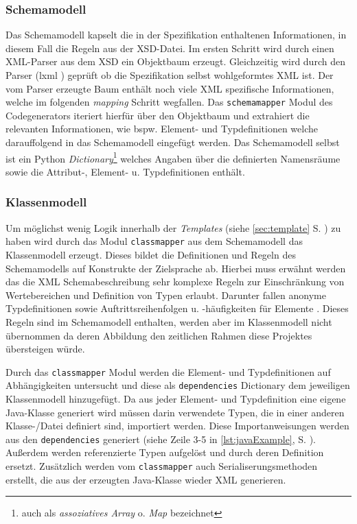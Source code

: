 \subsubsection{Schemamodell}
\label{sec:schemamodel}

Das Schemamodell kapselt die in der Spezifikation enthaltenen Informationen, in diesem Fall die Regeln aus der \gls{XSD}-Datei. Im ersten Schritt wird durch einen XML-Parser aus dem \gls{XSD} ein Objektbaum erzeugt. Gleichzeitig wird durch den Parser (lxml \cite{lxml}) geprüft ob die Spezifikation selbst wohlgeformtes \gls{XML} ist.
Der vom Parser erzeugte Baum enthält noch viele \gls{XML} spezifische Informationen, welche im folgenden \emph{mapping} Schritt wegfallen. Das \texttt{schemamapper} Modul des Codegenerators iteriert hierfür über den Objektbaum und extrahiert die relevanten Informationen, wie bspw. Element- und Typdefinitionen welche darauffolgend in das Schemamodell eingefügt werden. Das Schemamodell selbst ist ein Python \emph{Dictionary}\footnote{auch als \emph{assoziatives Array} o. \emph{Map} bezeichnet} welches Angaben über die definierten Namensräume sowie die Attribut-, Element- u. Typdefinitionen enthält.

\subsubsection{Klassenmodell}
\label{sec:classmodel}

Um möglichst wenig Logik innerhalb der \emph{Templates} (siehe \cref{sec:template} S. \pageref{sec:template}) zu haben wird durch das Modul \texttt{classmapper} aus dem Schemamodell das Klassenmodell erzeugt. Dieses bildet die Definitionen und Regeln des Schemamodells auf Konstrukte der Zielsprache ab. Hierbei muss erwähnt werden das die XML Schemabeschreibung sehr komplexe Regeln zur Einschränkung von Wertebereichen und Definition von Typen erlaubt. Darunter fallen anonyme Typdefinitionen sowie Auftrittsreihenfolgen u. -häufigkeiten für Elemente \cite{XMLschema}. Dieses Regeln sind im Schemamodell enthalten, werden aber im Klassenmodell nicht übernommen da deren Abbildung den zeitlichen Rahmen diese Projektes übersteigen würde.

Durch das \texttt{classmapper} Modul werden die Element- und Typdefinitionen auf Abhängigkeiten untersucht und diese als \texttt{dependencies} Dictionary dem jeweiligen Klassenmodell hinzugefügt. Da aus jeder Element- und Typdefinition eine eigene Java-Klasse generiert wird müssen darin verwendete Typen, die in einer anderen Klasse-/Datei definiert sind, importiert werden. Diese Importanweisungen werden aus den \texttt{dependencies} generiert (siehe Zeile 3-5 in \cref{lst:javaExample}, S. \pageref{lst:javaExample}).
Außerdem werden referenzierte Typen aufgelöst und durch deren Definition ersetzt. Zusätzlich werden vom \texttt{classmapper} auch Serialiserungsmethoden erstellt, die aus der erzeugten Java-Klasse wieder \gls{XML} generieren.

